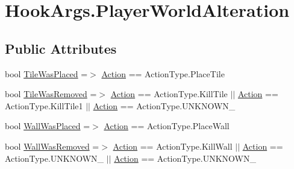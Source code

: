 \hypertarget{structOTA_1_1Plugin_1_1HookArgs_1_1PlayerWorldAlteration}{}\section{Hook\+Args.\+Player\+World\+Alteration}
\label{structOTA_1_1Plugin_1_1HookArgs_1_1PlayerWorldAlteration}
\subsection*{Public Attributes}
\begin{DoxyCompactItemize}
\item 
bool \hyperlink{structOTA_1_1Plugin_1_1HookArgs_1_1PlayerWorldAlteration_a9d6244e97aa5bde81da59b668a3a858c}{Tile\+Was\+Placed} =$>$ \hyperlink{structOTA_1_1Plugin_1_1HookArgs_1_1PlayerWorldAlteration_a83f49f18996a7b98657455bfd5a756c3}{Action} == Action\+Type.\+Place\+Tile
\item 
bool \hyperlink{structOTA_1_1Plugin_1_1HookArgs_1_1PlayerWorldAlteration_a74ffea87c772d3acbafbe8be5d812afe}{Tile\+Was\+Removed} =$>$ \hyperlink{structOTA_1_1Plugin_1_1HookArgs_1_1PlayerWorldAlteration_a83f49f18996a7b98657455bfd5a756c3}{Action} == Action\+Type.\+Kill\+Tile $\vert$$\vert$ \hyperlink{structOTA_1_1Plugin_1_1HookArgs_1_1PlayerWorldAlteration_a83f49f18996a7b98657455bfd5a756c3}{Action} == Action\+Type.\+Kill\+Tile1 $\vert$$\vert$ \hyperlink{structOTA_1_1Plugin_1_1HookArgs_1_1PlayerWorldAlteration_a83f49f18996a7b98657455bfd5a756c3}{Action} == Action\+Type.\+U\+N\+K\+N\+O\+W\+N\+\_
\item 
bool \hyperlink{structOTA_1_1Plugin_1_1HookArgs_1_1PlayerWorldAlteration_a83e33243f4ca49b4ed25b0424022e5c0}{Wall\+Was\+Placed} =$>$ \hyperlink{structOTA_1_1Plugin_1_1HookArgs_1_1PlayerWorldAlteration_a83f49f18996a7b98657455bfd5a756c3}{Action} == Action\+Type.\+Place\+Wall
\item 
bool \hyperlink{structOTA_1_1Plugin_1_1HookArgs_1_1PlayerWorldAlteration_abb879989fac794cc5e8e15586a511dbd}{Wall\+Was\+Removed} =$>$ \hyperlink{structOTA_1_1Plugin_1_1HookArgs_1_1PlayerWorldAlteration_a83f49f18996a7b98657455bfd5a756c3}{Action} == Action\+Type.\+Kill\+Wall $\vert$$\vert$ \hyperlink{structOTA_1_1Plugin_1_1HookArgs_1_1PlayerWorldAlteration_a83f49f18996a7b98657455bfd5a756c3}{Action} == Action\+Type.\+U\+N\+K\+N\+O\+W\+N\+\_ $\vert$$\vert$ \hyperlink{structOTA_1_1Plugin_1_1HookArgs_1_1PlayerWorldAlteration_a83f49f18996a7b98657455bfd5a756c3}{Action} == Action\+Type.\+U\+N\+K\+N\+O\+W\+N\+\_
\end{DoxyCompactItemize}
